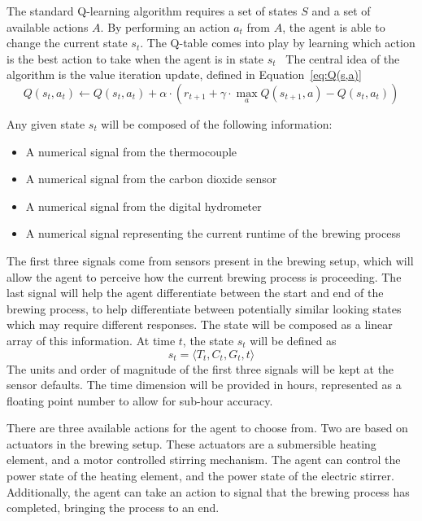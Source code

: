 \documentclass[draftclsnofoot,onecolumn,letterpaper,10pt]{IEEEtran}
\begin{document}
The standard Q-learning algorithm requires a set of states $S$ and a set of available actions $A$.
By performing an action $a_t$ from $A$, the agent is able to change the current state $s_t$.
The Q-table comes into play by learning which action is the best action to take when the agent is in state $s_t$~\cite{SuttonBarto}
The central idea of the algorithm is the value iteration update, defined in Equation~\ref{eq:Q(s,a)}
\begin{equation}\label{eq:Q(s,a)}
	Q(s_t,a_t) \leftarrow Q(s_t, a_t) + \alpha \cdot \left( r_{t+1} + \gamma \cdot \max_a Q(s_{t+1},a) - Q(s_t,a_t) \right)
\end{equation}

Any given state $s_t$ will be composed of the following information:
\begin{itemize}
	\item A numerical signal from the thermocouple
	\item A numerical signal from the carbon dioxide sensor
	\item A numerical signal from the digital hydrometer
	\item A numerical signal representing the current runtime of the brewing process
\end{itemize}
The first three signals come from sensors present in the brewing setup, which will allow the agent to perceive how the current brewing process is proceeding.
The last signal will help the agent differentiate between the start and end of the brewing process, to help differentiate between potentially similar looking states which may require different responses.
The state will be composed as a linear array of this information.
At time $t$, the state $s_t$ will be defined as
\begin{equation}
	s_t = \langle T_t, C_t, G_t, t \rangle
\end{equation}
The units and order of magnitude of the first three signals will be kept at the sensor defaults.
The time dimension will be provided in hours, represented as a floating point number to allow for sub-hour accuracy.

There are three available actions for the agent to choose from.
Two are based on actuators in the brewing setup.
These actuators are a submersible heating element, and a motor controlled stirring mechanism.
The agent can control the power state of the heating element, and the power state of the electric stirrer.
Additionally, the agent can take an action to signal that the brewing process has completed, bringing the process to an end.
\end{document}
